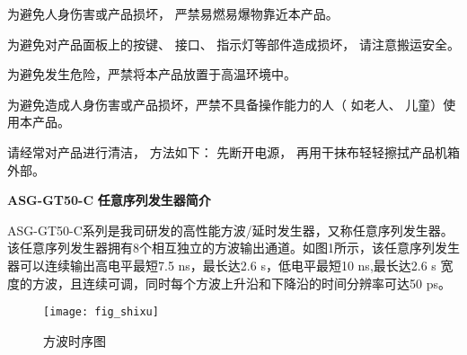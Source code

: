 \vspace{0.2cm}
为避免人身伤害或产品损坏， 严禁易燃易爆物靠近本产品。

\vspace{0.7cm}

\vspace{0.2cm}
为避免对产品面板上的按键、 接口、 指示灯等部件造成损坏， 请注意搬运安全。

\vspace{0.7cm}

\vspace{0.2cm}
为避免发生危险，严禁将本产品放置于高温环境中。

\newpage
\vspace{0.7cm}

\vspace{0.2cm}
为避免造成人身伤害或产品损坏，严禁不具备操作能力的人（ 如老人、 儿童）使用本产品。

\vspace{0.7cm}

\vspace{0.2cm}
请经常对产品进行清洁， 方法如下： 先断开电源， 再用干抹布轻轻擦拭产品机箱外部。

%

\newpage
\noindent\huge \textbf{ASG-GT50-C} \xiaoer\textbf{任意序列发生器简介}
\vspace{0.6cm}

\normalsize ASG-GT50-C\song 系列是我司研发的高性能方波/延时发生器，又称任意序列发生器。该任意序列发生器拥有8个相互独立的方波输出通道。如图1所示，该任意序列发生器可以连续输出高电平最短7.5 ns，最长达2.6 s，低电平最短10 ns,最长达2.6 s 宽度的方波，且连续可调，同时每个方波上升沿和下降沿的时间分辨率可达50 ps。
\begin{figure}[ht]
\centering
\texttt{[image: fig\_shixu]}
\caption{方波时序图}\label{fig:fig1}
\end{figure}
\vspace{0.5cm}

